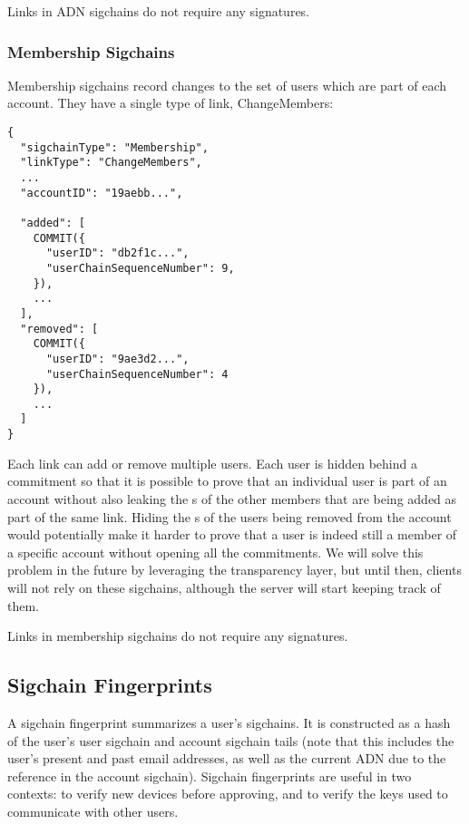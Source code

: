 Links in ADN sigchains do not require any signatures.

\subsubsection{Membership Sigchains}

Membership sigchains record changes to the set of users which are part of each account. They have a
single type of link, \textsf{ChangeMembers}:

\begin{Verbatim}
{
  "sigchainType": "Membership",
  "linkType": "ChangeMembers",
  ...
  "accountID": "19aebb...",

  "added": [
    COMMIT({
      "userID": "db2f1c...",
      "userChainSequenceNumber": 9,
    }),
    ...
  ],
  "removed": [
    COMMIT({
      "userID": "9ae3d2...",
      "userChainSequenceNumber": 4
    }),
    ...
  ]
}
\end{Verbatim}

Each link can add or remove multiple users. Each user is hidden behind a commitment so that it is
possible to prove that an individual user is part of an account without also leaking the {\userID}s
of the other members that are being added as part of the same link. Hiding the {\userID}s of the
users being removed from the account would potentially make it harder to prove that a user is indeed
still a member of a specific account without opening all the commitments. We will solve this problem
in the future by leveraging the transparency layer, but until then, clients will not rely on these
sigchains, although the server will start keeping track of them.

Links in membership sigchains do not require any signatures.

\subsection{Sigchain Fingerprints}
\label{subsec:fingerprints}
A sigchain fingerprint summarizes a user's sigchains. It is constructed as a hash of the user's user
sigchain and account sigchain tails (note that this includes the user's present and past email
addresses, as well as the current ADN due to the reference in the account sigchain). Sigchain
fingerprints are useful in two contexts: to verify new devices before approving, and to verify the
keys used to communicate with other users.


